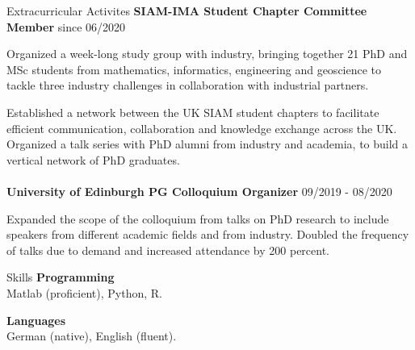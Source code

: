 \documentclass{resume} %
\begin{document}
\begin{rSection}{Extracurricular Activites}
{\bf SIAM-IMA Student Chapter Committee Member} \hfill{since 06/2020}

Organized a week-long study group with industry, bringing together 21 PhD and MSc students from mathematics, informatics, engineering and geoscience to tackle three industry challenges in collaboration with industrial partners. 

Established a network between the UK SIAM student chapters to facilitate efficient communication, collaboration and knowledge exchange across the UK. Organized a talk series with PhD alumni from industry and academia, to build a vertical network of PhD graduates. 
\\
\\
{\bf University of Edinburgh PG Colloquium Organizer} \hfill{09/2019 - 08/2020}

Expanded the scope of the colloquium from talks on PhD research to include speakers from different academic fields and from industry. Doubled the frequency of talks due to demand and increased attendance by 200 percent.
\end{rSection}

\begin{rSection}{Skills}
{\bf Programming}\\
Matlab (proficient), Python, R.

{\bf Languages}\\
German (native), English (fluent). 
\end{rSection}
\end{document}
